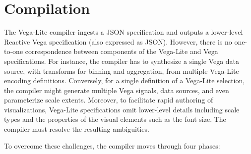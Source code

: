 \section{Compilation}
\label{sec:vl:compiler}

The Vega-Lite compiler ingests a JSON specification and outputs a lower-level
Reactive Vega specification (also expressed as JSON). However, there is no
one-to-one correspondence between components of the Vega-Lite and Vega
specifications. For instance, the compiler has to synthesize a single Vega data
source, with transforms for binning and aggregation, from multiple Vega-Lite
encoding definitions. Conversely, for a single definition of a Vega-Lite
selection, the compiler might generate multiple Vega signals, data sources, and
even parameterize scale extents. Moreover, to facilitate rapid authoring of
visualizations, Vega-Lite specifications omit lower-level details including
scale types and the properties of the visual elements such as the font size. The
compiler must resolve the resulting ambiguities.

To overcome these challenges, the compiler moves through four phases:

